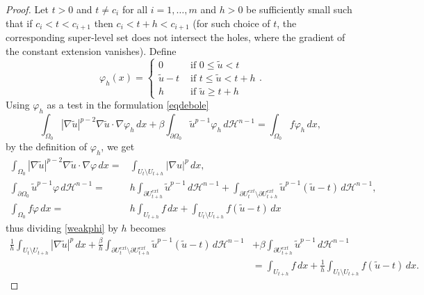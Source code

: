 \documentclass[10pt,a4paper]{amsart}
\newcommand{\abs}[1]{{\left|#1\right|}}
\newcommand{\dH}{d\mathcal{H}^{n-1}}
\begin{document}
\begin{proof}
    Let $t>0$ and $t\neq c_i$ for all $i=1,\dots, m$ and $h>0$ be sufficiently small such that if $c_i<t<c_{i+1}$ then $c_i<t+h<c_{i+1}$ (for such choice of $t$, the corresponding super-level set does not intersect the holes, where the gradient of the constant extension vanishes). Define
    \begin{equation*}
        \varphi_h(x)=\begin{cases}
                0&\text{ if } 0\leq \tilde u<t \\
                \tilde u-t&\text{ if } t\leq \tilde u<t+h\\
                h &\text{ if }\tilde u\geq t+h
                    \end{cases}.
    \end{equation*}
    Using $\varphi_h$ as a test in the formulation \eqref{eqdebole}
    \begin{equation}\label{weakphi}
        \int_{\Omega_0}\abs{\nabla \tilde u}^{p-2}\nabla \tilde u\cdot\nabla\varphi_h\,dx+\beta\int_{\partial\Omega_0}\tilde u^{p-1}\varphi_h\,\dH=\int_{\Omega_0}f\varphi_h\,dx,
    \end{equation}
    by the definition of $\varphi_h$, we get
    \begin{equation*}
        \begin{split}
            \int_{\Omega_0}\abs{\nabla \tilde u}^{p-2}\nabla \tilde u\cdot\nabla\varphi\,dx=& \int_{U_t\setminus U_{t+h}}\abs{\nabla u}^p\,dx,\\
            \int_{\partial\Omega_0}\tilde u^{p-1}\varphi\,\dH=&h\int_{\partial U_{t+h}^{ext}}\tilde u^{p-1}\,\dH+\int_{\partial U_{t}^{ext}\setminus\partial U_{t+h}^{ext}}\tilde u^{p-1}(\tilde u-t)\,\dH,\\ \int_{\Omega_0}f\varphi\,dx=&h\int_{U_{t+h}}f\,dx+\int_{U_t\setminus U_{t+h}}f(\tilde u-t)\,dx
        \end{split}
    \end{equation*}
    thus dividing \eqref{weakphi} by $h$ becomes
    \begin{equation}\label{INVENTO}
    \begin{split}
        \frac{1}{h}\int_{U_t\setminus U_{t+h}}\abs{\nabla \tilde u}^p\,dx+\frac{\beta}{h}\int_{\partial U_{t}^{ext}\setminus\partial U_{t+h}^{ext}}\tilde u^{p-1}(\tilde u-t)\,\dH&+\beta\int_{\partial U_{t+h}^{ext}}\tilde u^{p-1}\,\dH\\
        &=\int_{U_{t+h}}f\,dx+\frac{1}{h}\int_{U_t\setminus U_{t+h}}f(\tilde u-t)\,dx.
    \end{split}

\end{equation}
\end{proof}
\end{document}
